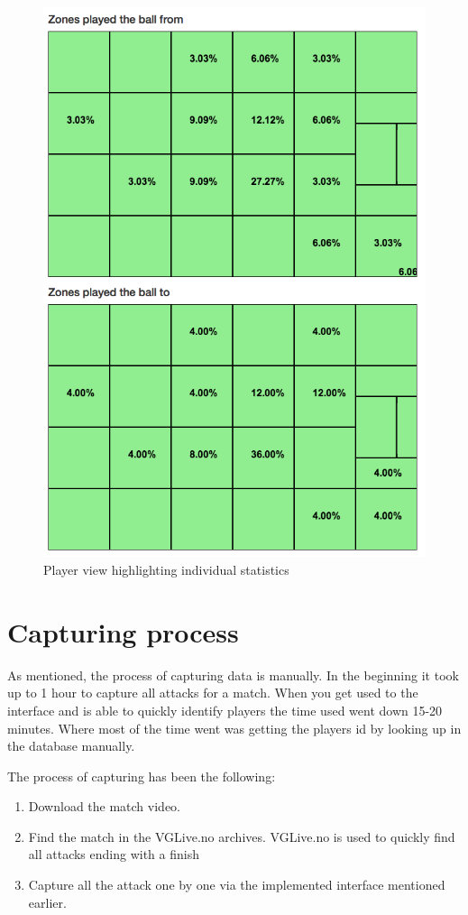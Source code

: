 \begin{figure}[ht!]
\centering
\includegraphics[width=1\textwidth]{images/general/player_view2.png}
\caption{Player view highlighting individual statistics}
\label{fig:player_view2}
\end{figure}


\section{Capturing process}
\label{sec:capprocess}

As mentioned, the process of capturing data is manually. In the beginning it took up to 1 hour to capture all attacks for a match. When you get used to the interface and is able to quickly identify players the time used went down 15-20 minutes. Where most of the time went was getting the players id by looking up in the database manually. 

The process of capturing has been the following:
\begin{enumerate}
\item Download the match video.
\item Find the match in the VGLive.no archives. VGLive.no is used to quickly find all attacks ending with a finish
\item Capture all the attack one by one via the implemented interface mentioned earlier.
\end{enumerate}



